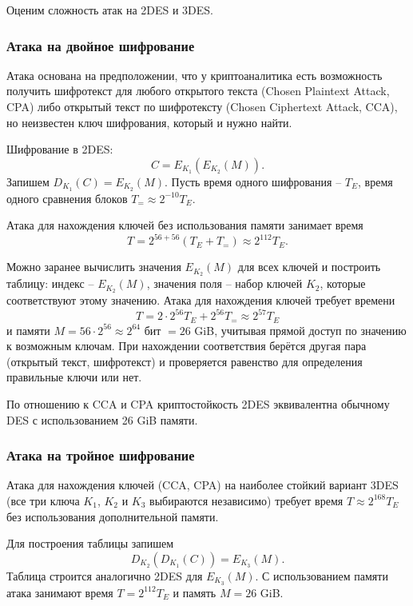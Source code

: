 Оценим сложность атак на 2DES и 3DES.

\subsubsection{Атака на двойное шифрование}


Атака основана на предположении, что у криптоаналитика есть возможность получить шифротекст для любого открытого текста (Chosen Plaintext Attack, CPA) либо открытый текст по шифротексту (Chosen Ciphertext Attack, CCA), но неизвестен ключ шифрования, который и нужно найти.

Шифрование в 2DES:
    \[ C = E_{K_1}( E_{K_2}(M)). \]
Запишем $D_{K_1}(C) = E_{K_2}(M)$. Пусть время одного шифрования -- $T_E$, время одного сравнения блоков $T_{=} \approx 2^{-10} T_E$.

Атака для нахождения ключей без использования памяти занимает время
    \[ T = 2^{56 + 56} (T_E + T_{=}) \approx 2^{112} T_E. \]

Можно заранее вычислить значения $E_{K_2}(M)$ для всех ключей и построить таблицу: индекс -- $E_{K_2}(M)$, значения поля -- набор ключей $K_2$, которые соответствуют этому значению. Атака для нахождения ключей требует времени
    \[ T = 2 \cdot 2^{56} T_E + 2^{56} T_{=} \approx 2^{57} T_E \]
и памяти $M = 56 \cdot 2^{56} \approx 2^{64}$ бит $= 26$ GiB, учитывая прямой доступ по значению к возможным ключам. При нахождении соответствия берётся другая пара (открытый текст, шифротекст) и проверяется равенство для определения правильные ключи или нет.

По отношению к CCA и CPA криптостойкость 2DES эквивалентна обычному DES с использованием 26 GiB памяти.

\subsubsection{Атака на тройное шифрование}

Атака для нахождения ключей (CCA, CPA) на наиболее стойкий вариант 3DES (все три ключа $K_1$, $K_2$ и $K_3$ выбираются независимо) требует время $T \approx 2^{168} T_E$ без использования дополнительной памяти.

Для построения таблицы запишем
    \[ D_{K_2}( D_{K_1}( C)) = E_{K_3} (M). \]
Таблица строится аналогично 2DES для $E_{K_3}(M)$. С использованием памяти атака занимают время $T = 2^{112} T_E$ и память $M = 26$ GiB.
